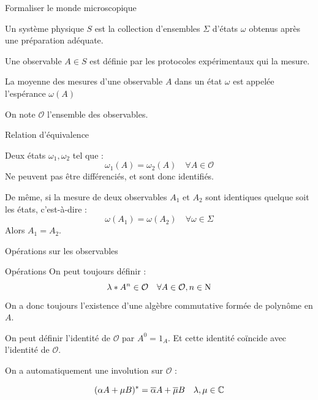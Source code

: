 \documentclass[11pt, xcolor=table]{beamer}
\begin{document}
\begin{frame}{Formaliser le monde microscopique}
    \begin{mydef}
        Un système physique $S$ est la collection d'ensembles $\Sigma$ d'états $\omega$ obtenus après une préparation adéquate.

        Une observable $A \in S$ est définie par les protocoles expérimentaux qui la mesure.

        La moyenne des mesures d'une observable $A$ dans un état $\omega$ est appelée l'espérance $\omega(A)$

        On note $\mathcal{O}$ l'ensemble des observables.
    \end{mydef}
\end{frame}

\begin{frame}{Relation d'équivalence}
    \begin{myth}
        Deux états $\omega_1, \omega_2$ tel que :
        \[
            \omega_1 ( A) = \omega_2(A) \quad \forall A \in \mathcal{O}
        \]
        Ne peuvent pas être différenciés, et sont donc identifiés.
        
        De même, si la mesure de deux observables $A_1$ et $A_2$ sont identiques quelque soit les états, c'est-à-dire :
        \[
            \omega(A_1) = \omega(A_2) \quad \forall \omega \in \Sigma
        \]
        Alors $A_1 = A_2$.
    \end{myth}
\end{frame}

\begin{frame}{Opérations sur les observables}
    \begin{block}{Opérations}
        On peut toujours définir :
        \[
            \lambda * A^n \in \mathcal{O} \quad \forall A \in \mathcal{O}, n \in \mathrm{N}
        \]
        On a donc toujours l'existence d'une algèbre commutative formée de polynôme en $A$.

        On peut définir l'identité de $\mathcal{O}$ par $A^0 = 1_A$. Et cette identité coïncide avec l'identité de $\mathcal{O}$.
    \end{block}

    On a automatiquement une involution sur $\mathcal{O}$ :
    \begin{mydef}
        \[
            (\alpha A + \mu B)^\ast = \overline{\alpha}A + \overline{\mu}B \quad \lambda, \mu \in \mathbb{C} 
        \]
    \end{mydef}
    
\end{frame}
\end{document}
